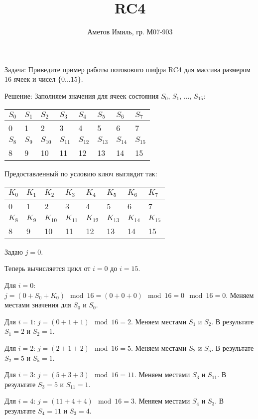 \documentclass[10pt]{article}
\author{Аметов Имиль, гр. М07-903}
\title{RC4}
\begin{document}
\maketitle
Задача: Приведите пример работы потокового шифра RC4 для массива размером 16 ячеек и чисел $\{ 0 ... 15 \}$.

Решение: Заполняем значения для ячеек состояния $S_0$, $S_1$, ..., $S_{15}$:

\begin{tabular}{l|l|l|l|l|l|l|l}
  $S_0$ & $S_1$ & $S_2$ & $S_3$ & $S_4$ & $S_5$ & $S_6$ & $S_7$ \\ \hline
  0 & 1 & 2 & 3 & 4 & 5 & 6 & 7 \\ \hline
  $S_8$ & $S_9$ & $S_{10}$ & $S_{11}$ & $S_{12}$ & $S_{13}$ & $S_{14}$ & $S_{15}$ \\ \hline
  8 & 9 & 10 & 11 & 12 & 13 & 14 & 15 \\ \hline
\end{tabular}

Предоставленный по условию ключ выглядит так:

\begin{tabular}{l|l|l|l|l|l|l|l}
  $K_0$ & $K_1$ & $K_2$ & $K_3$ & $K_4$ & $K_5$ & $K_6$ & $K_7$ \\ \hline
  0 & 1 & 2 & 3 & 4 & 5 & 6 & 7 \\ \hline
  $K_8$ & $K_9$ & $K_{10}$ & $K_{11}$ & $K_{12}$ & $K_{13}$ & $K_{14}$ & $K_{15}$ \\ \hline
  8 & 9 & 10 & 11 & 12 & 13 & 14 & 15 \\ \hline
\end{tabular}

Задаю $j = 0$.

Теперь вычисляется цикл от $i = 0$ до $i = 15$.

Для $i = 0$: $j = (0 + S_0 + K_0) \mod 16 = (0 + 0 + 0) \mod 16 = 0 \mod 16 = 0$. Меняем местами значения для $S_0$ и $S_0$.

Для $i = 1$: $j = (0 + 1 + 1) \mod 16 = 2$. Меняем местами $S_1$ и $S_2$. В результате $S_1 = 2$ и $S_2 = 1$.

Для $i = 2$: $j = (2 + 1 + 2) \mod 16 = 5$. Меняем местами $S_2$ и $S_5$. В результате $S_2 = 5$ и $S_5 = 1$.

Для $i = 3$: $j = (5 + 3 + 3) \mod 16 = 11$. Меняем местами $S_3$ и $S_{11}$. В результате $S_3 = 5$ и $S_{11} = 1$.

Для $i = 4$: $j = (11 + 4 + 4) \mod 16 = 3$. Меняем местами $S_4$ и $S_{3}$. В результате $S_4 = 11$ и $S_{3} = 4$.
\end{document}
